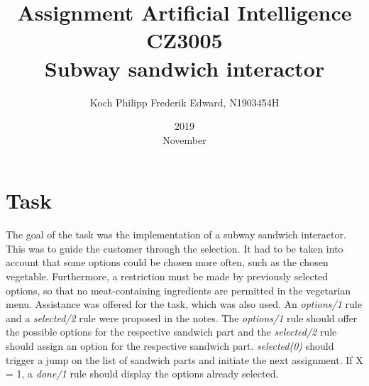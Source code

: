 \documentclass{article}
\title{Assignment Artificial Intelligence CZ3005 \\ Subway sandwich interactor}
\date{2019 \\ November}
\author{Koch Philipp Frederik Edward, N1903454H}
\begin{document}
	\maketitle
	\section{Task}
	The goal of the task was the implementation of a subway sandwich interactor. This was to guide the customer through the selection. It had to be taken into account that some options could be chosen more often, such as the chosen vegetable. Furthermore, a restriction must be made by previously selected options, so that no meat-containing ingredients are permitted in the vegetarian menu. Assistance was offered for the task, which was also used. An \textit{options/1} rule and a \textit{selected/2} rule were proposed in the notes. The \textit{options/1} rule should offer the possible options for the respective sandwich part and the \textit{selected/2} rule should assign an option for the respective sandwich part. \textit{selected(0)} should trigger a jump on the list of sandwich parts and initiate the next assignment. If X = 1, a \textit{done/1} rule should display the options already selected. 
\end{document}
